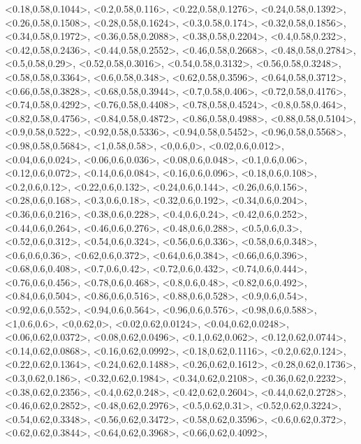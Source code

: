 \documentclass[a4paper,10pt]{article}
\begin{document}
\begin{eulernotebook}
\begin{euleroutput}
  <0.18,0.58,0.1044>,
  <0.2,0.58,0.116>,
  <0.22,0.58,0.1276>,
  <0.24,0.58,0.1392>,
  <0.26,0.58,0.1508>,
  <0.28,0.58,0.1624>,
  <0.3,0.58,0.174>,
  <0.32,0.58,0.1856>,
  <0.34,0.58,0.1972>,
  <0.36,0.58,0.2088>,
  <0.38,0.58,0.2204>,
  <0.4,0.58,0.232>,
  <0.42,0.58,0.2436>,
  <0.44,0.58,0.2552>,
  <0.46,0.58,0.2668>,
  <0.48,0.58,0.2784>,
  <0.5,0.58,0.29>,
  <0.52,0.58,0.3016>,
  <0.54,0.58,0.3132>,
  <0.56,0.58,0.3248>,
  <0.58,0.58,0.3364>,
  <0.6,0.58,0.348>,
  <0.62,0.58,0.3596>,
  <0.64,0.58,0.3712>,
  <0.66,0.58,0.3828>,
  <0.68,0.58,0.3944>,
  <0.7,0.58,0.406>,
  <0.72,0.58,0.4176>,
  <0.74,0.58,0.4292>,
  <0.76,0.58,0.4408>,
  <0.78,0.58,0.4524>,
  <0.8,0.58,0.464>,
  <0.82,0.58,0.4756>,
  <0.84,0.58,0.4872>,
  <0.86,0.58,0.4988>,
  <0.88,0.58,0.5104>,
  <0.9,0.58,0.522>,
  <0.92,0.58,0.5336>,
  <0.94,0.58,0.5452>,
  <0.96,0.58,0.5568>,
  <0.98,0.58,0.5684>,
  <1,0.58,0.58>,
  <0,0.6,0>,
  <0.02,0.6,0.012>,
  <0.04,0.6,0.024>,
  <0.06,0.6,0.036>,
  <0.08,0.6,0.048>,
  <0.1,0.6,0.06>,
  <0.12,0.6,0.072>,
  <0.14,0.6,0.084>,
  <0.16,0.6,0.096>,
  <0.18,0.6,0.108>,
  <0.2,0.6,0.12>,
  <0.22,0.6,0.132>,
  <0.24,0.6,0.144>,
  <0.26,0.6,0.156>,
  <0.28,0.6,0.168>,
  <0.3,0.6,0.18>,
  <0.32,0.6,0.192>,
  <0.34,0.6,0.204>,
  <0.36,0.6,0.216>,
  <0.38,0.6,0.228>,
  <0.4,0.6,0.24>,
  <0.42,0.6,0.252>,
  <0.44,0.6,0.264>,
  <0.46,0.6,0.276>,
  <0.48,0.6,0.288>,
  <0.5,0.6,0.3>,
  <0.52,0.6,0.312>,
  <0.54,0.6,0.324>,
  <0.56,0.6,0.336>,
  <0.58,0.6,0.348>,
  <0.6,0.6,0.36>,
  <0.62,0.6,0.372>,
  <0.64,0.6,0.384>,
  <0.66,0.6,0.396>,
  <0.68,0.6,0.408>,
  <0.7,0.6,0.42>,
  <0.72,0.6,0.432>,
  <0.74,0.6,0.444>,
  <0.76,0.6,0.456>,
  <0.78,0.6,0.468>,
  <0.8,0.6,0.48>,
  <0.82,0.6,0.492>,
  <0.84,0.6,0.504>,
  <0.86,0.6,0.516>,
  <0.88,0.6,0.528>,
  <0.9,0.6,0.54>,
  <0.92,0.6,0.552>,
  <0.94,0.6,0.564>,
  <0.96,0.6,0.576>,
  <0.98,0.6,0.588>,
  <1,0.6,0.6>,
  <0,0.62,0>,
  <0.02,0.62,0.0124>,
  <0.04,0.62,0.0248>,
  <0.06,0.62,0.0372>,
  <0.08,0.62,0.0496>,
  <0.1,0.62,0.062>,
  <0.12,0.62,0.0744>,
  <0.14,0.62,0.0868>,
  <0.16,0.62,0.0992>,
  <0.18,0.62,0.1116>,
  <0.2,0.62,0.124>,
  <0.22,0.62,0.1364>,
  <0.24,0.62,0.1488>,
  <0.26,0.62,0.1612>,
  <0.28,0.62,0.1736>,
  <0.3,0.62,0.186>,
  <0.32,0.62,0.1984>,
  <0.34,0.62,0.2108>,
  <0.36,0.62,0.2232>,
  <0.38,0.62,0.2356>,
  <0.4,0.62,0.248>,
  <0.42,0.62,0.2604>,
  <0.44,0.62,0.2728>,
  <0.46,0.62,0.2852>,
  <0.48,0.62,0.2976>,
  <0.5,0.62,0.31>,
  <0.52,0.62,0.3224>,
  <0.54,0.62,0.3348>,
  <0.56,0.62,0.3472>,
  <0.58,0.62,0.3596>,
  <0.6,0.62,0.372>,
  <0.62,0.62,0.3844>,
  <0.64,0.62,0.3968>,
  <0.66,0.62,0.4092>,

\end{euleroutput}
\end{eulernotebook}
\end{document}
